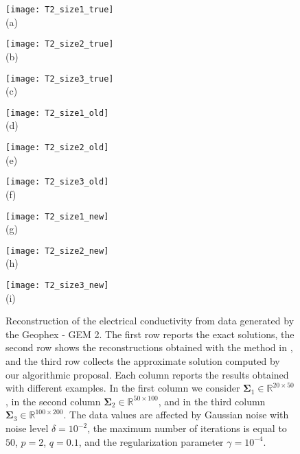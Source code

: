 \documentclass[final,leqno]{siamltex}
\newcommand{\R}{{\mathbb R}}
\newcommand{\Sigmab}{\mathbf{\Sigma}}
\begin{document}
\begin{figure}
\centering
\begin{minipage}{0.3\linewidth}
	\centering
	\texttt{[image: T2\_size1\_true]}\\(a)
\end{minipage}
\begin{minipage}{0.3\linewidth}
	\centering
	\texttt{[image: T2\_size2\_true]}\\(b)
\end{minipage}
\begin{minipage}{0.3\linewidth}
	\centering
	\texttt{[image: T2\_size3\_true]}\\(c)
\end{minipage}

\begin{minipage}{0.3\linewidth}
	\centering
	\texttt{[image: T2\_size1\_old]}\\(d)
\end{minipage}
\begin{minipage}{0.3\linewidth}
	\centering
	\texttt{[image: T2\_size2\_old]}\\(e)
\end{minipage}
\begin{minipage}{0.3\linewidth}
	\centering
	\texttt{[image: T2\_size3\_old]}\\(f)
\end{minipage}

\begin{minipage}{0.3\linewidth}
	\centering
	\texttt{[image: T2\_size1\_new]}\\(g)
\end{minipage}
\begin{minipage}{0.3\linewidth}
	\centering
	\texttt{[image: T2\_size2\_new]}\\(h)
\end{minipage}
\begin{minipage}{0.3\linewidth}
	\centering
	\texttt{[image: T2\_size3\_new]}\\(i)
\end{minipage}

\caption{Reconstruction of the electrical conductivity from data generated by the Geophex - GEM 2. The first row reports the exact solutions, the second row shows the reconstructions obtained with the method in \cite{ddrv19}, and the third row collects the approximate solution computed by our algorithmic proposal. Each column reports the results obtained with different examples. In the first column we consider $\Sigmab_1\in\R^{20\times 50}$, in the second column $\Sigmab_2\in\R^{50\times 100}$, and in the third column $\Sigmab_3\in\R^{100\times 200}$. The data values are affected by Gaussian noise with noise level $\delta = 10^{-2}$, the maximum number of iterations is equal to $50$, $p=2$, $q=0.1$, and the regularization parameter $\gamma = 10^{-4}$.}
\label{Figure4}
\end{figure}
\end{document}
